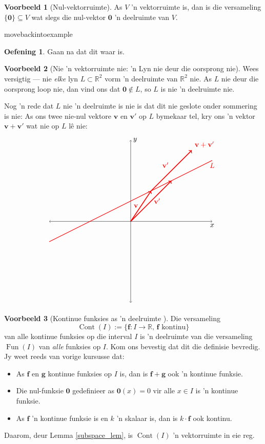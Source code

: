 \documentclass[a4paper,11pt]{book}
\theoremstyle{definition}
\newtheorem{exercise}{Oefening}
\newtheorem{example_environment}{Voorbeeld}[chapter]
\newcommand{\be}{\begin{equation}}
\newcommand{\ee}{\end{equation}}
\newcommand{\ba}{\begin{aligned}}
\newcommand{\ea}{\end{aligned}}
\newcommand{\ve}[1]{\mathbf{#1}}
\newenvironment{example}
	{
		\begin{oframed}
		\begin{example_environment}
	}
	{
		\end{example_environment}
		\end{oframed}
	}
\DeclareMathOperator{\Fun}{Fun}
\DeclareMathOperator{\Cont}{Cont}
\begin{document}
\begin{example}[Nul-vektorruimte] As $V$ 'n vektorruimte is, dan is die
	versameling $\{\ve{0}\} \subseteq V$ wat slegs die nul-vektor $\ve{0}$
	'n deelruimte van $V$.

\end{example}movebackintoexample
	\begin{exercise}
	Gaan na dat dit waar is.
\end{exercise}
\begin{example}[Nie 'n vektorruimte nie: 'n Lyn nie deur die oorsprong nie]
	Wees versigtig --- nie \emph{elke} lyn $L \subset \mathbb{R}^2$ vorm 'n
	deelruimte van  $\mathbb{R}^2$ nie. As $L$ nie deur die oorsprong loop
	nie, dan vind ons dat $\ve{0} \notin L$, so $L$ is nie 'n deelruimte
	nie.

	Nog 'n rede dat $L$ nie 'n deelruimte is nie is dat dit nie geslote
	onder sommering is nie: As ons twee nie-nul vektore $\ve{v}$ en
	$\ve{v}'$ op $L$ bymekaar tel, kry ons 'n vektor $\ve{v} + \ve{v}'$ wat
	nie op $L$ l{\^e} nie:
	\be \label{pic_of_bad_L}
	\ba
	\begin{tikzpicture}[scale=2]
		\draw[<->] (-2, 0) -- (2,0) node[below] {$x$};
		\draw[<->] (0, -2) -- (0, 2) node[right] {$y$};
		\draw[thick, red] (-2, -0.5) -- (2, 1.5) node[below] {$L$};
		\draw[very thick, red, ->] (0,0) -- node[left] {$\ve{v}$} (0.5,
		0.75);
		\draw[very thick, red, ->] (0,0) -- node[right] {$\ve{v}'$} (1, 1);
		\draw[very thick, red, ->] (0.5,0.75) -- node[above left]
		{$\ve{v}'$} (1.5, 1.75) node[above right] {$\ve{v} + \ve{v}'$};
	\end{tikzpicture}
\ea
\ee
\end{example}



\begin{example}[Kontinue funksies as 'n deelruimte ] Die versameling
	\[
		\Cont(I) := \{ \ve{f}: I \rightarrow \mathbb{R}, \, \ve{f} 
		\mbox{ kontinu} \}
	\]
	van alle kontinue funksies op die interval $I$ is 'n deelruimte van die
	versameling $\Fun(I)$ van \emph{alle} funksies op $I$. Kom ons bevestig
	dat dit die definisie bevredig. Jy weet reeds van vorige kursusse dat:
	\begin{itemize}
		\item As $\ve{f}$ en $\ve{g}$ kontinue funksies op $I$ is, dan is
			$\ve{f} + \ve{g}$ ook 'n kontinue funksie.
		\item Die nul-funksie $\ve{0}$ gedefinieer as $\ve{0}(x) = 0$ vir
			alle $x \in I$ is 'n kontinue funksie.
		\item As $\ve{f}$ 'n kontinue funksie is en $k$ 'n skalaar is, dan
			is $k \cdot \ve{f}$ ook kontinu.
	\end{itemize}
	Daarom, deur Lemma \ref{subspace_lem}, is $\Cont(I)$ 'n vektorruimte in
	eie reg.
\end{example}
\end{document}
